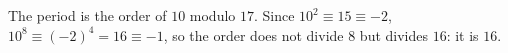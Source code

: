The period is the order of $10$ modulo $17$. Since $10^2\equiv15\equiv-2$, $10^8\equiv(-2)^4=16\equiv-1$, so the order does not divide $8$ but divides $16$: it is $\boxed{16}$.
